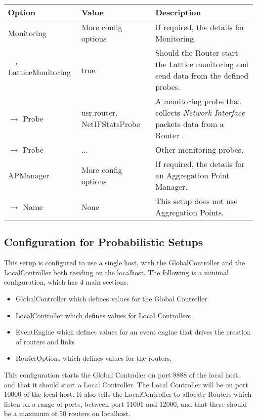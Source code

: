 {
\small

\begin{longtable}{ | p{3.4cm} | p{3.1cm} | p{7.3cm} | }

\hline
\textbf{Option} & \textbf{Value} & \textbf{Description} \\
\hline
Monitoring & More config options & If required, the details for
Monitoring. \\
\hline
$\rightarrow$ LatticeMonitoring & true & Should the Router start the Lattice
monitoring and send data from the defined probes. \\
\hline
$\rightarrow$ Probe & usr.router. NetIFStatsProbe & A monitoring
probe that collects \emph{Network Interface} packets data from a Router . \\
\hline
$\rightarrow$ Probe & ... & Other monitoring probes. \\
\hline
APManager & More config options & If required, the details for
an Aggregation Point Manager. \\
\hline
 $\rightarrow$  Name & None & This setup does not use Aggregation Points.
\\
\hline
\end{longtable}

\normalsize
}



\subsection{Configuration for Probabilistic Setups}

This setup is configured to use a single host, with the
GlobalController and the LocalController both residing on the localhost.
The following is a minimal configuration, which has 4 main sections:

\begin{itemize}
\item GlobalController which defines values for the Global Controller
\item LocalController which defines values for Local Controllers
\item EventEngine which defines values for an event engine
  that drives the creation of routers and links 
\item RouterOptions which defines values for the routers.
\end{itemize}

\noindent This configuration starts the Global
Controller on port 8888 of the local host, and that it should start
a Local Controller.
The Local Controller will be on
port 10000 of the local host.
It also tells the LocalController to allocate Routers which listen on
a range of ports, between port 11001 and 12000, and that there should
be a maximum of 50 routers on localhost.


